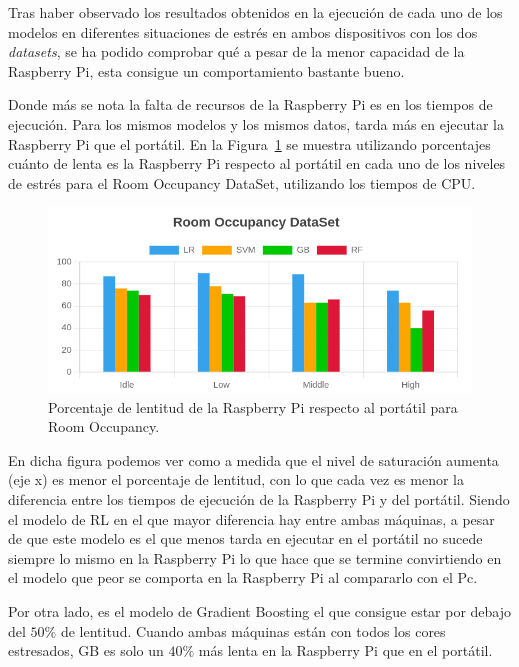 \documentclass[a4paper, 12pt]{book}
\begin{document}
Tras haber observado los resultados obtenidos en la ejecución de cada uno de los modelos en diferentes situaciones de estrés en ambos dispositivos con los dos \textit{datasets}, se ha podido comprobar qué a pesar de la menor capacidad de la Raspberry Pi, esta consigue un comportamiento bastante bueno.

Donde más se nota la falta de recursos de la Raspberry Pi es en los tiempos de ejecución. Para los mismos modelos y los mismos datos, tarda más en ejecutar la Raspberry Pi que el portátil. En la Figura~\ref{fig:per_occupancy} se muestra utilizando porcentajes cuánto de lenta es la Raspberry Pi respecto al portátil en cada uno de los niveles de estrés para el Room Occupancy DataSet, utilizando los tiempos de CPU.

\begin{figure}[htb]
  \centering
  \includegraphics[width=14cm, keepaspectratio]{img/per_occupancy.png}
  \caption{Porcentaje de lentitud de la Raspberry Pi respecto al portátil para Room Occupancy.}
  \label{fig:per_occupancy}
\end{figure}

En dicha figura podemos ver como a medida que el nivel de saturación aumenta (eje x) es menor el porcentaje de lentitud, con lo que cada vez es menor la diferencia entre los tiempos de ejecución de la Raspberry Pi y del portátil. Siendo el modelo de RL en el que mayor diferencia hay entre ambas máquinas, a pesar de que este modelo es el que menos tarda en ejecutar en el portátil no sucede siempre lo mismo en la Raspberry Pi lo que hace que se termine convirtiendo en el modelo que peor se comporta en la Raspberry Pi al compararlo con el Pc.

Por otra lado, es el modelo de Gradient Boosting el que consigue estar por debajo del $50\%$ de lentitud. Cuando ambas máquinas están con todos los cores estresados, GB es solo un $40\%$ más lenta en la Raspberry Pi que en el portátil.
\end{document}
